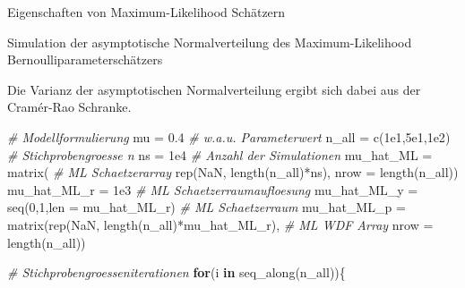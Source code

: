 \documentclass[
  8pt,
  ignorenonframetext,
]{beamer}
\newenvironment{Shaded}{\begin{snugshade}}{\end{snugshade}}
\newcommand{\AttributeTok}[1]{\textcolor[rgb]{0.77,0.63,0.00}{#1}}
\newcommand{\CommentTok}[1]{\textcolor[rgb]{0.56,0.35,0.01}{\textit{#1}}}
\newcommand{\ConstantTok}[1]{\textcolor[rgb]{0.00,0.00,0.00}{#1}}
\newcommand{\ControlFlowTok}[1]{\textcolor[rgb]{0.13,0.29,0.53}{\textbf{#1}}}
\newcommand{\DecValTok}[1]{\textcolor[rgb]{0.00,0.00,0.81}{#1}}
\newcommand{\FloatTok}[1]{\textcolor[rgb]{0.00,0.00,0.81}{#1}}
\newcommand{\FunctionTok}[1]{\textcolor[rgb]{0.00,0.00,0.00}{#1}}
\newcommand{\NormalTok}[1]{#1}
\newcommand{\OtherTok}[1]{\textcolor[rgb]{0.56,0.35,0.01}{#1}}
\newcommand{\SpecialCharTok}[1]{\textcolor[rgb]{0.00,0.00,0.00}{#1}}
\begin{document}
\begin{frame}[fragile]{Eigenschaften von Maximum-Likelihood Schätzern}
\protect\hypertarget{eigenschaften-von-maximum-likelihood-schuxe4tzern-1}{}
\small

Simulation der asymptotische Normalverteilung des Maximum-Likelihood
Bernoulliparameterschätzers

\footnotesize

Die Varianz der asymptotischen Normalverteilung ergibt sich dabei aus
der Cramér-Rao Schranke.

\vspace{1mm}

\begin{Shaded}
\begin{Highlighting}[]
\CommentTok{\# Modellformulierung}
\NormalTok{mu          }\OtherTok{=} \FloatTok{0.4}                                           \CommentTok{\# w.a.u. Parameterwert}
\NormalTok{n\_all       }\OtherTok{=} \FunctionTok{c}\NormalTok{(}\FloatTok{1e1}\NormalTok{,}\FloatTok{5e1}\NormalTok{,}\FloatTok{1e2}\NormalTok{)                                }\CommentTok{\# Stichprobengroesse n}
\NormalTok{ns          }\OtherTok{=} \FloatTok{1e4}                                           \CommentTok{\# Anzahl der Simulationen}
\NormalTok{mu\_hat\_ML   }\OtherTok{=} \FunctionTok{matrix}\NormalTok{(                                       }\CommentTok{\# ML Schaetzerarray}
                        \FunctionTok{rep}\NormalTok{(}\ConstantTok{NaN}\NormalTok{,}
                        \FunctionTok{length}\NormalTok{(n\_all)}\SpecialCharTok{*}\NormalTok{ns),}
                        \AttributeTok{nrow =} \FunctionTok{length}\NormalTok{(n\_all))}
\NormalTok{mu\_hat\_ML\_r }\OtherTok{=} \FloatTok{1e3}                                           \CommentTok{\# ML Schaetzerraumaufloesung}
\NormalTok{mu\_hat\_ML\_y }\OtherTok{=} \FunctionTok{seq}\NormalTok{(}\DecValTok{0}\NormalTok{,}\DecValTok{1}\NormalTok{,}\AttributeTok{len =}\NormalTok{ mu\_hat\_ML\_r)                    }\CommentTok{\# ML Schaetzerraum}
\NormalTok{mu\_hat\_ML\_p }\OtherTok{=} \FunctionTok{matrix}\NormalTok{(}\FunctionTok{rep}\NormalTok{(}\ConstantTok{NaN}\NormalTok{, }\FunctionTok{length}\NormalTok{(n\_all)}\SpecialCharTok{*}\NormalTok{mu\_hat\_ML\_r),   }\CommentTok{\# ML WDF Array}
                     \AttributeTok{nrow =} \FunctionTok{length}\NormalTok{(n\_all))}

\CommentTok{\# Stichprobengroesseniterationen}
\ControlFlowTok{for}\NormalTok{(i }\ControlFlowTok{in} \FunctionTok{seq\_along}\NormalTok{(n\_all))\{}


\end{Highlighting}
\end{Shaded}
\end{frame}
\end{document}
